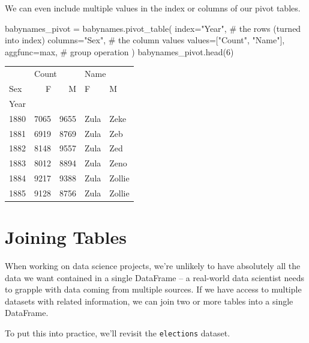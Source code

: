 \documentclass[
  letterpaper,
  DIV=11,
  numbers=noendperiod]{scrreprt}
\newenvironment{Shaded}{\begin{snugshade}}{\end{snugshade}}
\newcommand{\BuiltInTok}[1]{\textcolor[rgb]{0.00,0.23,0.31}{#1}}
\newcommand{\CommentTok}[1]{\textcolor[rgb]{0.37,0.37,0.37}{#1}}
\newcommand{\DecValTok}[1]{\textcolor[rgb]{0.68,0.00,0.00}{#1}}
\newcommand{\NormalTok}[1]{\textcolor[rgb]{0.00,0.23,0.31}{#1}}
\newcommand{\OperatorTok}[1]{\textcolor[rgb]{0.37,0.37,0.37}{#1}}
\newcommand{\StringTok}[1]{\textcolor[rgb]{0.13,0.47,0.30}{#1}}
\begin{document}
We can even include multiple values in the index or columns of our pivot
tables.

\begin{Shaded}
\begin{Highlighting}[]
\NormalTok{babynames\_pivot }\OperatorTok{=}\NormalTok{ babynames.pivot\_table(}
\NormalTok{    index}\OperatorTok{=}\StringTok{"Year"}\NormalTok{,     }\CommentTok{\# the rows (turned into index)}
\NormalTok{    columns}\OperatorTok{=}\StringTok{"Sex"}\NormalTok{,    }\CommentTok{\# the column values}
\NormalTok{    values}\OperatorTok{=}\NormalTok{[}\StringTok{"Count"}\NormalTok{, }\StringTok{"Name"}\NormalTok{], }
\NormalTok{    aggfunc}\OperatorTok{=}\BuiltInTok{max}\NormalTok{,   }\CommentTok{\# group operation}
\NormalTok{)}
\NormalTok{babynames\_pivot.head(}\DecValTok{6}\NormalTok{)}
\end{Highlighting}
\end{Shaded}

\begin{tabular}{lrrll}
\toprule
{} & \multicolumn{2}{l}{Count} & \multicolumn{2}{l}{Name} \\
Sex &     F &     M &     F &       M \\
Year &       &       &       &         \\
\midrule
1880 &  7065 &  9655 &  Zula &    Zeke \\
1881 &  6919 &  8769 &  Zula &     Zeb \\
1882 &  8148 &  9557 &  Zula &     Zed \\
1883 &  8012 &  8894 &  Zula &    Zeno \\
1884 &  9217 &  9388 &  Zula &  Zollie \\
1885 &  9128 &  8756 &  Zula &  Zollie \\
\bottomrule
\end{tabular}

\hypertarget{joining-tables}{%
\section{Joining Tables}\label{joining-tables}}

When working on data science projects, we're unlikely to have absolutely
all the data we want contained in a single DataFrame -- a real-world
data scientist needs to grapple with data coming from multiple sources.
If we have access to multiple datasets with related information, we can
join two or more tables into a single DataFrame.

To put this into practice, we'll revisit the \texttt{elections} dataset.
\end{document}
